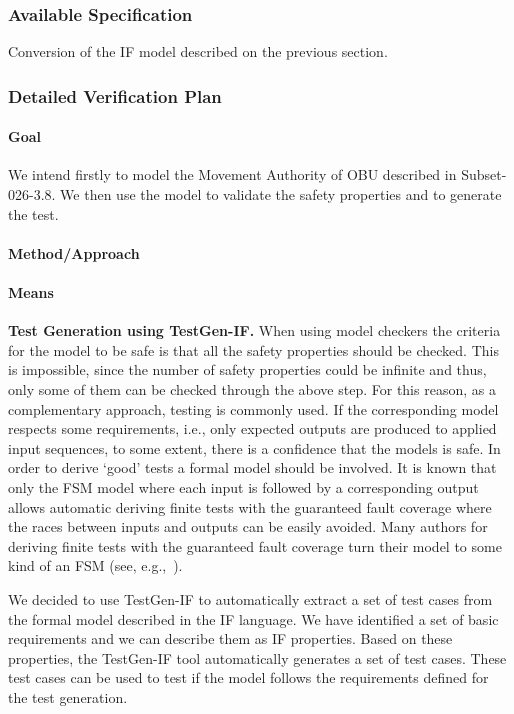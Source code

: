 \documentclass{template/openetcs_article}
\begin{document}
\subsubsection{Available Specification}
Conversion of the IF model described on the previous section.

\subsubsection{Detailed Verification Plan}

\paragraph{Goal} 
We intend firstly to model the Movement Authority of OBU described in
Subset-026-3.8. We then use the model to validate the safety
properties and to generate the test.

\paragraph{Method/Approach}

\paragraph{Means}

\textbf{Test Generation using TestGen-IF.}
When using model checkers the criteria for the model to be safe is that all the
safety properties should be checked. This is impossible, since the number of
safety properties could be infinite and thus, only some of them can be checked
through the above step.
For this reason, as a complementary approach, testing is commonly used. If the
corresponding model respects some requirements, i.e., only expected outputs are
produced to applied input sequences, to some extent, there is a confidence that
the models is safe. In order to derive ‘good’ tests a formal model should be
involved. It is known that only the FSM model where each input is followed by a
corresponding output allows automatic deriving finite tests with the guaranteed
fault coverage where the races between inputs and outputs can be easily avoided.
 Many authors for deriving finite tests with the guaranteed fault coverage turn
their model to some kind of an FSM (see,
e.g.,~\cite{springintveld2001testing,zymc11,Gromov2009}).

We decided to use TestGen-IF to automatically extract a set of test cases from
the formal model described in the IF language. We have identified a set of basic
requirements and we can describe them as IF properties.  Based on these
properties, the TestGen-IF tool automatically generates a set of test cases.
These test cases can be used to test if the model follows the requirements defined for the test generation.
\end{document}
